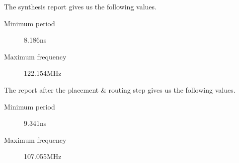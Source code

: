 The synthesis report gives us the following values.
\begin{description}
	\item[Minimum period] 8.186ns
	\item[Maximum frequency] 122.154MHz
\end{description}

The report after the placement \& routing step gives us the following values.
\begin{description}
	\item[Minimum period] 9.341ns
	\item[Maximum frequency] 107.055MHz
\end{description}
